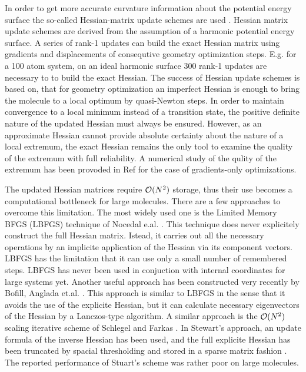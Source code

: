 \documentclass[prl,aps,twocolumn,showpacs,twocolumngrid,superbib]{revtex4}
\begin{document}
In order to get more accurate curvature information about the 
potential energy surface the so-called Hessian-matrix update schemes
are used \cite{RFletcher}. 
Hessian matrix update schemes are derived from the assumption of a 
harmonic potential energy surface. A series of rank-1 updates
can build the exact Hessian matrix using gradients and displacements
of consequtive geometry optimization steps.
E.g. for a 100 atom system, on an ideal harmonic surface 300 rank-1
updates are necessary to to build the exact Hessian. The success
of Hessian update schemes is based on, that for geometry optimization
an imperfect Hessian is enough to bring the molecule to a local 
optimum by quasi-Newton steps. In order to maintain convergence 
to a local
minimum instead of a transition state, the positive definite nature
of the updated Hessian must always be ensured. However, as 
an approximate Hessian cannot provide absolute certainty about the 
nature of a local extremum, the exact Hessian remains the only tool
to examine the quality of the extremum with full reliability. 
A numerical study of the qulity of the extremum has been provoded
in Ref \cite{Wales_saddlepoint} for the case of 
gradients-only optimizations.

The updated Hessian matrices require ${\cal{O}}(N^{2})$ storage, thus
their use becomes a computational bottleneck for large molecules.
There are a few approaches to overcome this limitation.
The most widely used one is the Limited Memory BFGS (LBFGS) 
technique of Nocedal
e.al. \cite{nocedal_lbgs}. This technique does never explicitely 
construct the full Hessian matrix. Istead, it carries out all 
the necessary operations by an implicite application of the Hessian
via its component vectors. LBFGS
has the limitation that it can use only a small number of remembered
steps.
LBFGS has never been used in conjuction with internal coordinates
for large systems yet.
Another useful approach has been constructed very recently by Bofill,
Anglada et.al. \cite{bofill_lanczos}. This approach is similar
to LBFGS in the sense that it avoids the use of the explicite
Hessian, but it can calculate necessary eigenvectors of the 
Hessian by a Lanczos-type algorithm. A
similar approach is the ${\cal{O}}(N^{2})$ scaling iterative
scheme of Schlegel and Farkas \cite{schlegel_on2iter}.
In Stewart's approach, an update
formula of the inverse Hessian has been used, and the full explicite
Hessian has been truncated by spacial thresholding and stored in a 
sparse matrix fashion \cite{Stewart_crambin_opt}. 
The reported performance
of Stuart's scheme was rather poor on large molecules.
\end{document}
